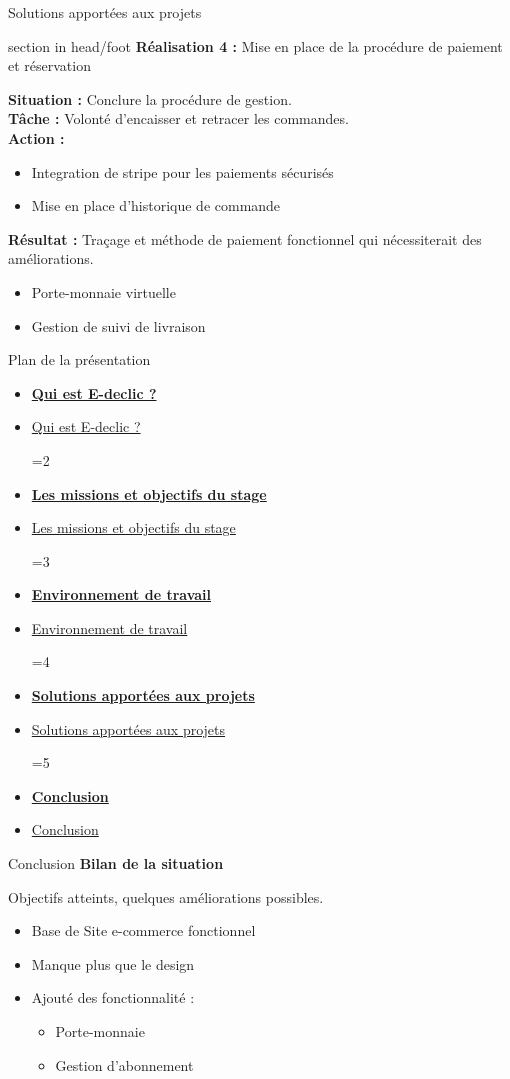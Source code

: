 \documentclass{beamer}
\newcommand{\planLine}[4]{
  \ifnum#1=#2
    \item \hyperlink{#3}{\textbf{\large #4}}
  \else
    \item \hyperlink{#3}{#4}
  \fi
}
\newcommand{\planSlide}[1]{
  	\begin{frame}{Plan de la présentation}
  		\begin{center}
  			\begin{minipage}{1\textwidth}
				\begin{itemize}
      			\planLine{#1}{1}{organisation}{Qui est E-declic ?}
      			\planLine{#1}{2}{sujet}{Les missions et objectifs du stage}
      			\planLine{#1}{3}{environnement}{Environnement de travail}
      			\planLine{#1}{4}{realisation}{Solutions apportées aux projets}
      			\planLine{#1}{5}{conclusion}{Conclusion}
	    		\end{itemize}
  		\end{minipage}
	\end{center}
	\vfill
	\end{frame}
}
\begin{document}
\begin{frame}{Solutions apportées aux projets}
	\begin{beamercolorbox}[wd=\paperwidth,ht=1.5em,dp=0.5em,leftskip=0.5cm]{section in head/foot}
  		\large \textbf{Réalisation 4 :} \normalsize Mise en place de la procédure de paiement et réservation
	\end{beamercolorbox}
	\vspace{0.5em}
	\begin{center}
  		\begin{minipage}{0.9\textwidth}
  			\textbf{Situation :} Conclure la procédure de gestion.\\
  			\textbf{Tâche :} Volonté d'encaisser et retracer les commandes.\\
  			\textbf{Action :}
  				\begin{itemize}
  					\item Integration de stripe pour les paiements sécurisés
  					\item Mise en place d'historique de commande
  				\end{itemize}
			\textbf{Résultat :} Traçage et méthode de paiement fonctionnel qui nécessiterait des améliorations.
				\begin{itemize}
					\item Porte-monnaie virtuelle
					\item Gestion de suivi de livraison
				\end{itemize}
  		\end{minipage}
	\end{center}
	\vfill
\end{frame}

\planSlide{5}

\begin{frame}[label=conclusion]{Conclusion}
  \large \textbf{Bilan de la situation}

  \vspace{0.5em}
  Objectifs atteints, quelques améliorations possibles.
  \begin{itemize}
  	\item Base de Site e-commerce fonctionnel
  	\item Manque plus que le design
  	\item Ajouté des fonctionnalité : 
  	\begin{itemize}
  		\item Porte-monnaie
  		\item Gestion d'abonnement
  	\end{itemize}
  \end{itemize}
\end{frame}
\end{document}
